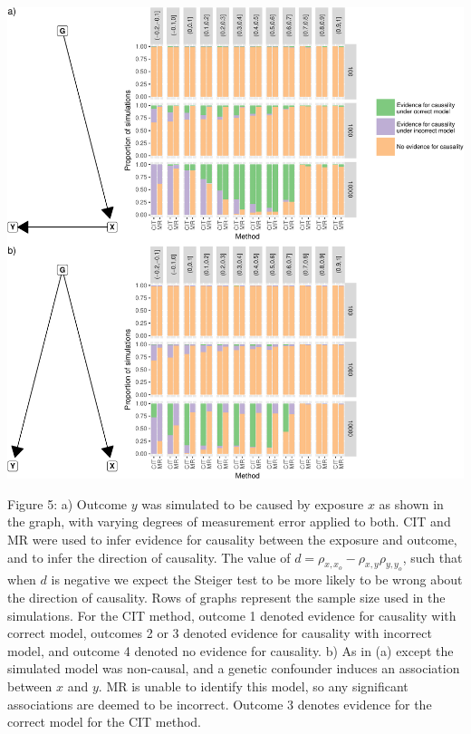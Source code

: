 \documentclass[]{article}
\begin{document}
\newpage

\includegraphics{manuscript_files/figure-latex/cit_mr_comparison_figure-1.pdf}

Figure 5: a) Outcome \(y\) was simulated to be caused by exposure \(x\)
as shown in the graph, with varying degrees of measurement error applied
to both. CIT and MR were used to infer evidence for causality between
the exposure and outcome, and to infer the direction of causality. The
value of \(d = \rho_{x, x_o} - \rho_{x,y}\rho_{y,y_o}\), such that when
\(d\) is negative we expect the Steiger test to be more likely to be
wrong about the direction of causality. Rows of graphs represent the
sample size used in the simulations. For the CIT method, outcome 1
denoted evidence for causality with correct model, outcomes 2 or 3
denoted evidence for causality with incorrect model, and outcome 4
denoted no evidence for causality. b) As in (a) except the simulated
model was non-causal, and a genetic confounder induces an association
between \(x\) and \(y\). MR is unable to identify this model, so any
significant associations are deemed to be incorrect. Outcome 3 denotes
evidence for the correct model for the CIT method.

\newpage
\end{document}
